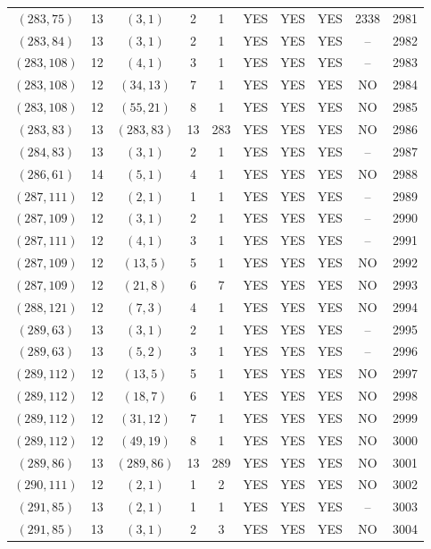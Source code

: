 \begin{longtable}{|c|c|c|c|c|c|c|c|c|c|}
$(283, 75)$ & 13 & $(3, 1)$ & 2 & 1 & YES & YES & YES & 2338 & 2981\\
$(283, 84)$ & 13 & $(3, 1)$ & 2 & 1 & YES & YES & YES & -- & 2982\\
$(283, 108)$ & 12 & $(4, 1)$ & 3 & 1 & YES & YES & YES & -- & 2983\\
$(283, 108)$ & 12 & $(34, 13)$ & 7 & 1 & YES & YES & YES & NO & 2984\\
$(283, 108)$ & 12 & $(55, 21)$ & 8 & 1 & YES & YES & YES & NO & 2985\\
$(283, 83)$ & 13 & $(283, 83)$ & 13 & 283 & YES & YES & YES & NO & 2986\\
$(284, 83)$ & 13 & $(3, 1)$ & 2 & 1 & YES & YES & YES & -- & 2987\\
$(286, 61)$ & 14 & $(5, 1)$ & 4 & 1 & YES & YES & YES & NO & 2988\\
$(287, 111)$ & 12 & $(2, 1)$ & 1 & 1 & YES & YES & YES & -- & 2989\\
$(287, 109)$ & 12 & $(3, 1)$ & 2 & 1 & YES & YES & YES & -- & 2990\\
$(287, 111)$ & 12 & $(4, 1)$ & 3 & 1 & YES & YES & YES & -- & 2991\\
$(287, 109)$ & 12 & $(13, 5)$ & 5 & 1 & YES & YES & YES & NO & 2992\\
$(287, 109)$ & 12 & $(21, 8)$ & 6 & 7 & YES & YES & YES & NO & 2993\\
$(288, 121)$ & 12 & $(7, 3)$ & 4 & 1 & YES & YES & YES & NO & 2994\\
$(289, 63)$ & 13 & $(3, 1)$ & 2 & 1 & YES & YES & YES & -- & 2995\\
$(289, 63)$ & 13 & $(5, 2)$ & 3 & 1 & YES & YES & YES & -- & 2996\\
$(289, 112)$ & 12 & $(13, 5)$ & 5 & 1 & YES & YES & YES & NO & 2997\\
$(289, 112)$ & 12 & $(18, 7)$ & 6 & 1 & YES & YES & YES & NO & 2998\\
$(289, 112)$ & 12 & $(31, 12)$ & 7 & 1 & YES & YES & YES & NO & 2999\\
$(289, 112)$ & 12 & $(49, 19)$ & 8 & 1 & YES & YES & YES & NO & 3000\\
$(289, 86)$ & 13 & $(289, 86)$ & 13 & 289 & YES & YES & YES & NO & 3001\\
$(290, 111)$ & 12 & $(2, 1)$ & 1 & 2 & YES & YES & YES & NO & 3002\\
$(291, 85)$ & 13 & $(2, 1)$ & 1 & 1 & YES & YES & YES & -- & 3003\\
$(291, 85)$ & 13 & $(3, 1)$ & 2 & 3 & YES & YES & YES & NO & 3004\\

\end{longtable}
